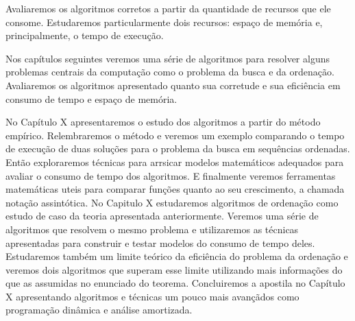 Avaliaremos os algoritmos corretos a partir da quantidade de recursos que ele consome.
Estudaremos particularmente dois recursos: espaço de memória e, principalmente, o tempo de execução.

Nos capítulos seguintes veremos uma série de algoritmos para resolver alguns problemas centrais da computação como o problema da busca e da ordenação.
Avaliaremos os algoritmos apresentado quanto sua corretude e sua eficiência em consumo de tempo e espaço de memória.

No Capítulo X apresentaremos o estudo dos algoritmos a partir do método empírico.
Relembraremos o método e veremos um exemplo comparando o tempo de execução de duas soluções para o problema da busca em sequências ordenadas.
Então exploraremos técnicas para arrsicar modelos matemáticos adequados para avaliar o consumo de tempo dos algoritmos.
E finalmente veremos ferramentas matemáticas uteis para comparar funções quanto ao seu crescimento, a chamada notação assintótica.
No Capitulo X estudaremos algoritmos de ordenação como estudo de caso da teoria apresentada anteriormente.
Veremos uma série de algoritmos que resolvem o mesmo problema e utilizaremos as técnicas apresentadas para construir e testar modelos do consumo de tempo deles.
Estudaremos também um limite teórico da eficiência do problema da ordenação e veremos dois algoritmos que superam esse limite utilizando mais informações do que as assumidas no enunciado do teorema.
Concluiremos a apostila no Capítulo X apresentando algoritmos e técnicas um pouco mais avançãdos como programação dinâmica e análise amortizada.

